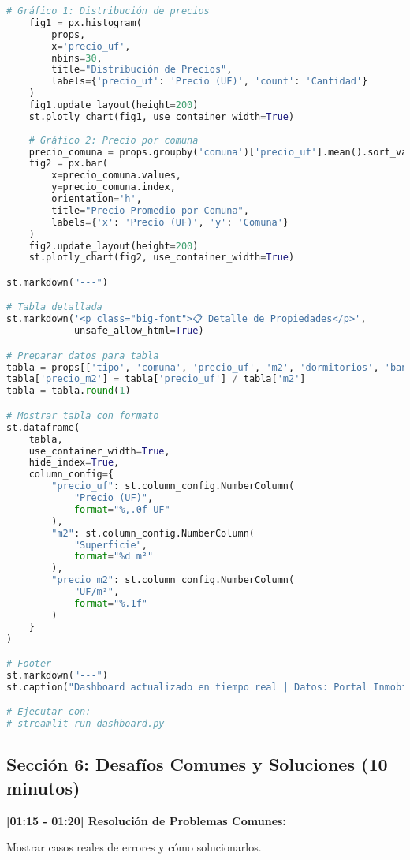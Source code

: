 \documentclass[11pt,a4paper]{article}
\begin{document}
\begin{lstlisting}[language=Python]
    # Gráfico 1: Distribución de precios
    fig1 = px.histogram(
        props, 
        x='precio_uf',
        nbins=30,
        title="Distribución de Precios",
        labels={'precio_uf': 'Precio (UF)', 'count': 'Cantidad'}
    )
    fig1.update_layout(height=200)
    st.plotly_chart(fig1, use_container_width=True)
    
    # Gráfico 2: Precio por comuna
    precio_comuna = props.groupby('comuna')['precio_uf'].mean().sort_values()
    fig2 = px.bar(
        x=precio_comuna.values,
        y=precio_comuna.index,
        orientation='h',
        title="Precio Promedio por Comuna",
        labels={'x': 'Precio (UF)', 'y': 'Comuna'}
    )
    fig2.update_layout(height=200)
    st.plotly_chart(fig2, use_container_width=True)

st.markdown("---")

# Tabla detallada
st.markdown('<p class="big-font">📋 Detalle de Propiedades</p>', 
            unsafe_allow_html=True)

# Preparar datos para tabla
tabla = props[['tipo', 'comuna', 'precio_uf', 'm2', 'dormitorios', 'banos']].copy()
tabla['precio_m2'] = tabla['precio_uf'] / tabla['m2']
tabla = tabla.round(1)

# Mostrar tabla con formato
st.dataframe(
    tabla,
    use_container_width=True,
    hide_index=True,
    column_config={
        "precio_uf": st.column_config.NumberColumn(
            "Precio (UF)",
            format="%,.0f UF"
        ),
        "m2": st.column_config.NumberColumn(
            "Superficie",
            format="%d m²"
        ),
        "precio_m2": st.column_config.NumberColumn(
            "UF/m²",
            format="%.1f"
        )
    }
)

# Footer
st.markdown("---")
st.caption("Dashboard actualizado en tiempo real | Datos: Portal Inmobiliario")

# Ejecutar con:
# streamlit run dashboard.py
\end{lstlisting}

\subsection{Sección 6: Desafíos Comunes y Soluciones (10 minutos)}

\textbf{[01:15 - 01:20] Resolución de Problemas Comunes:}

\begin{demobox}
Mostrar casos reales de errores y cómo solucionarlos.
\end{demobox}
\end{document}
